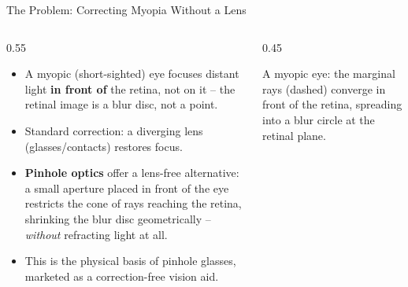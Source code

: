 \documentclass[aspectratio=169]{beamer}
\begin{document}
\begin{frame}{The Problem: Correcting Myopia Without a Lens}
  \begin{columns}
    \begin{column}{0.55\textwidth}
      \begin{itemize}
        \item A myopic (short-sighted) eye focuses distant light \textbf{in front of}
          the retina, not on it -- the retinal image is a blur disc, not a point.
        \item Standard correction: a diverging lens (glasses/contacts) restores focus.
        \item \textbf{Pinhole optics} offer a lens-free alternative: a small aperture
          placed in front of the eye restricts the cone of rays reaching the retina,
          shrinking the blur disc geometrically -- \emph{without} refracting light at all.
        \item This is the physical basis of pinhole glasses, marketed as a
          correction-free vision aid.
      \end{itemize}
    \end{column}
    \begin{column}{0.45\textwidth}
      \centering
      \vspace{0.2cm}
      \small A myopic eye: the marginal rays (dashed) converge in front of the
      retina, spreading into a blur circle at the retinal plane.
    \end{column}
  \end{columns}
\end{frame}
\end{document}
